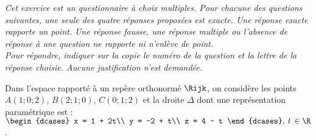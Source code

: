 \emph{Cet exercice est un questionnaire à choix multiples. Pour chacune des questions suivantes, une seule des quatre réponses proposées est exacte. Une réponse exacte rapporte un point. Une réponse fausse, une réponse multiple ou l'absence de réponse à une question ne rapporte ni n'enlève de point.\\[5pt]
	Pour répondre, indiquer sur la copie le numéro de la question et la lettre de la réponse choisie. Aucune justification n'est demandée.}

\medskip

Dans l'espace rapporté à un repère orthonormé $\Rijk$, on considère les points $A(1;0;2)$, $B(2;1;0)$, $C(0;1;2)$ et la droite $\Delta$ dont une représentation paramétrique est : $\begin{dcases} x = 1 + 2t\\ y = -2 + t\\ z = 4 - t \end{dcases},\: t\, \in \R$.

